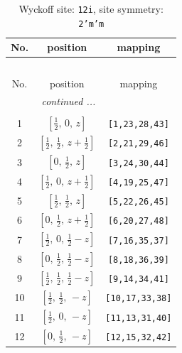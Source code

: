 \documentclass[fleqn,8pt]{jsarticle}
\begin{document}
\begin{longtable}{ccc}
\caption{Wyckoff site: {\tt 12i}, site symmetry: {\tt 2'm'm}}
 \\
 \hline \hline
No. & position & mapping \\ \hline \endfirsthead

\multicolumn{2}{l}{\tablename\ \thetable{}} \\
 \hline \hline
No. & position & mapping \\ \hline \endhead

 \hline \hline
\multicolumn{2}{r}{\footnotesize\it continued ...} \\ \endfoot

 \hline \hline
\multicolumn{2}{r}{} \\ \endlastfoot

1 & $\left[ \frac{1}{2},\, 0,\, z \right]$ & {\tt [1,23,28,43]} \\ \hline
2 & $\left[ \frac{1}{2},\, \frac{1}{2},\, z + \frac{1}{2} \right]$ & {\tt [2,21,29,46]} \\ \hline
3 & $\left[ 0,\, \frac{1}{2},\, z \right]$ & {\tt [3,24,30,44]} \\ \hline
4 & $\left[ \frac{1}{2},\, 0,\, z + \frac{1}{2} \right]$ & {\tt [4,19,25,47]} \\ \hline
5 & $\left[ \frac{1}{2},\, \frac{1}{2},\, z \right]$ & {\tt [5,22,26,45]} \\ \hline
6 & $\left[ 0,\, \frac{1}{2},\, z + \frac{1}{2} \right]$ & {\tt [6,20,27,48]} \\ \hline
7 & $\left[ \frac{1}{2},\, 0,\, \frac{1}{2} - z \right]$ & {\tt [7,16,35,37]} \\ \hline
8 & $\left[ 0,\, \frac{1}{2},\, \frac{1}{2} - z \right]$ & {\tt [8,18,36,39]} \\ \hline
9 & $\left[ \frac{1}{2},\, \frac{1}{2},\, \frac{1}{2} - z \right]$ & {\tt [9,14,34,41]} \\ \hline
10 & $\left[ \frac{1}{2},\, \frac{1}{2},\, - z \right]$ & {\tt [10,17,33,38]} \\ \hline
11 & $\left[ \frac{1}{2},\, 0,\, - z \right]$ & {\tt [11,13,31,40]} \\ \hline
12 & $\left[ 0,\, \frac{1}{2},\, - z \right]$ & {\tt [12,15,32,42]} \\
\end{longtable}
\renewcommand{\arraystretch}{1.2}
\end{document}
